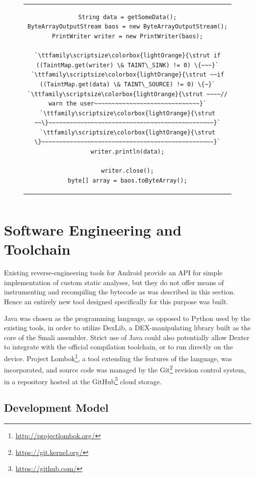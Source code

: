 \documentclass[12pt,twoside,notitlepage]{report}
\newcommand{\highlight}[1]{\colorbox{lightOrange}{\strut #1}}
\newcommand{\lsthl}[1] {\ttfamily\scriptsize\highlight{#1}}
\newcommand{\weblink}[1] {\footnote{\scriptsize\url{#1}}}
\begin{document}
\begin{figure}[h]
	\centering
	\begin{tabular}{c}
	\begin{lstlisting}
String data = getSomeData();
ByteArrayOutputStream baos = new ByteArrayOutputStream();
PrintWriter writer = new PrintWriter(baos);

`\lsthl{if ((TaintMap.get(writer) \& TAINT\_SINK) != 0) \{~~~}`
`\lsthl{~~if ((TaintMap.get(data) \& TAINT\_SOURCE) != 0) \{~}`
`\lsthl{~~~~// warn the user~~~~~~~~~~~~~~~~~~~~~~~~~~~~~~}`
`\lsthl{~~\}~~~~~~~~~~~~~~~~~~~~~~~~~~~~~~~~~~~~~~~~~~~~~~~}`
`\lsthl{\}~~~~~~~~~~~~~~~~~~~~~~~~~~~~~~~~~~~~~~~~~~~~~~~~~}`
writer.println(data);

writer.close();
byte[] array = baos.toByteArray();
	\end{lstlisting}
	\end{tabular}
	\begin{lstlisting}[caption={Writer interface used to turn data into a byte array, with sink instrumentation.},
	                   label={listing:Sink_ByteArray}]
	\end{lstlisting}
\end{figure}

\section{Software Engineering and Toolchain}

Existing reverse-engineering tools for Android provide an API for simple implementation of custom static analyses, but they do not offer means of instrumenting and recompiling the bytecode as was described in this section. Hence an entirely new tool designed specifically for this purpose was built.

Java was chosen as the programming language, as opposed to Python used by the existing tools, in order to utilize DexLib, a DEX-manipulating library built as the core of the Smali assembler. Strict use of Java could also potentially allow Dexter to integrate with the official compilation toolchain, or to run directly on the device. Project Lombok\weblink{http://projectlombok.org/}, a tool extending the features of the language, was incorporated, and source code was managed by the Git\weblink{https://git.kernel.org/} revision control system, in a repository hosted at the GitHub\weblink{https://github.com/} cloud storage.

\subsection{Development Model}
\end{document}
